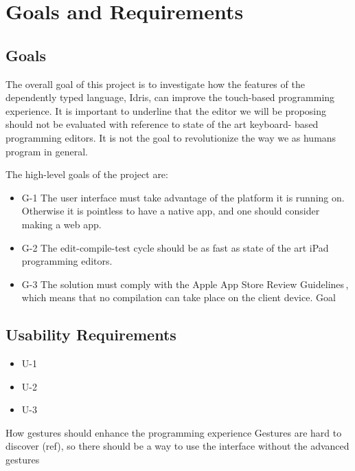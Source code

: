 \section{Goals and Requirements}

\subsection{Goals} The overall goal of this project is to investigate how the
features of the dependently typed language, Idris, can improve the touch-based
programming experience. It is important to underline that the editor we will be
proposing should not be evaluated with reference to state of the art keyboard-
based programming editors. It is not the goal to revolutionize the way we as
humans program in general.

The high-level goals of the project are:

\begin{itemize}          
	\item G-1 The user interface must take advantage of the platform it is running on. Otherwise it is pointless to have a native app, and one should consider making a web app.
	\item G-2 The edit-compile-test cycle should be as fast as state of the art iPad programming editors.     
	\item G-3 The solution must comply with the Apple App Store Review Guidelines\,\cite{AppStoreGuidelines}, which means that no compilation can take place on the client device.
Goal \end{itemize}

\subsection{Usability Requirements}

\begin{itemize}     
	\item U-1 
	\item U-2 
	\item U-3 
\end{itemize}

How gestures should enhance the programming experience Gestures are hard to
discover (ref), so there should be a way to use the interface without the
advanced gestures


